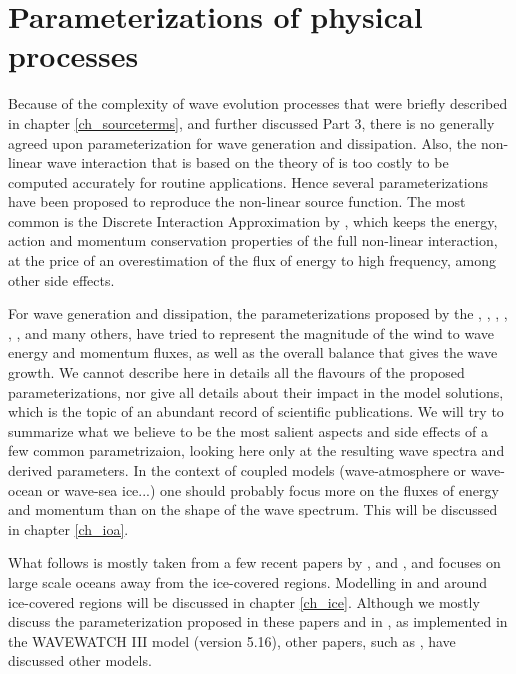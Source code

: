 \section{Parameterizations of physical processes}
Because of the complexity of wave evolution processes that were briefly described in chapter \ref{ch_sourceterms}, and further discussed Part 3, there is no generally agreed upon parameterization for wave generation and dissipation. Also, the non-linear 
wave interaction that is based on the theory of \cite{Hasselmann1962} is too costly to be computed accurately for routine applications. Hence several 
parameterizations have been proposed to reproduce the non-linear source function. The most common is the Discrete Interaction 
Approximation by \cite{Hasselmann&al.1985b}, which keeps the energy, action and momentum conservation properties of the full non-linear interaction, 
at the price of an overestimation of the flux of energy to high frequency, among other side effects. 

For wave generation and dissipation, the parameterizations proposed by the \cite{WAMDI1988}, \cite{WAMBook}, \cite{Tolman&Chalikov1996}, 
\cite{Banner&Morison2006},  \cite{Ardhuin&al.2010}, 
\cite{Rogers&al.2012}, and many others, have tried to represent the magnitude of the wind to wave energy and momentum fluxes, as well 
as the overall balance that gives the wave growth. We cannot describe here in details all the flavours of the proposed parameterizations, nor 
give all details about their impact in the model solutions, which is the topic of an abundant record of scientific publications. We will try to 
summarize what we believe to be the most salient aspects and side effects of a few common parametrizaion, looking here only at the resulting 
wave spectra and derived parameters. In the context of coupled models (wave-atmosphere or wave-ocean or wave-sea ice...) one should probably focus more 
on the fluxes of energy and momentum than on the shape of the wave spectrum. This will be discussed in chapter \ref{ch_ioa}. 


What follows is mostly taken from a few recent papers by \cite{Rascle&Ardhuin2013}, \cite{Roland&Ardhuin2014} and \cite{Stopa&al.2016c}, and
focuses on large 
scale oceans away from the ice-covered regions. Modelling in and around ice-covered regions will be discussed in chapter \ref{ch_ice}. Although we mostly discuss the parameterization proposed in these papers and 
in \cite{Zieger&al.2015}, as implemented in the WAVEWATCH III model (version 5.16), other papers, such as \cite{vanVledder&al.2016}, have discussed other models. 


